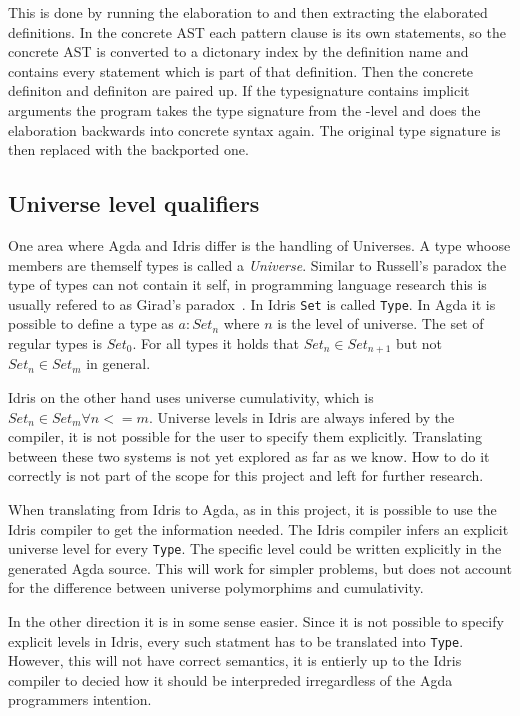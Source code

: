 This is done by running the elaboration to \tti and then extracting the
elaborated definitions. In the concrete AST each pattern clause is its own
statements, so the concrete AST is converted to a dictonary index by the
definition name and contains every statement which is part of that definition.
Then the concrete definiton and \tti definiton are paired up. If the
typesignature contains implicit arguments the program takes the type signature
from the \tti-level and does the elaboration backwards into concrete syntax
again. The original type signature is then replaced with the backported one.

\subsection{Universe level qualifiers}
One area where Agda and Idris differ is the handling of Universes.
A type whoose members are themself types is called a \textit{Universe}. Similar
to Russell's paradox the type of types can not contain it self, in programming
language research this is usually refered to as Girad's
paradox~\cite{coquand1986analysis}.  In Idris \lstinline{Set} is called \lstinline{Type}. In Agda it is possible to define a type as
$a : Set_n$ where $n$ is the level of universe. The set of regular types is
$Set_0$. For all types it holds that $Set_n \in Set_{n+1}$ but not $Set_n \in
Set_m$ in general.

Idris on the other hand uses universe cumulativity, which is $Set_n \in Set_m
\forall n <= m$. Universe levels in Idris are always infered by the compiler,
it is not possible for the user to specify them explicitly. Translating between
these two systems is not yet explored as far as we know. How to do it correctly
is not part of the scope for this project and left for further research.

When translating from Idris to Agda, as in this project, it is possible to use
the Idris compiler to get the information needed. The Idris compiler infers an
explicit universe level for every \lstinline{Type}. The specific level could be
written explicitly in the generated Agda source. This will work for simpler
problems, but does not account for the difference between universe polymorphims
and cumulativity.

In the other direction it is in some sense easier. Since it is not possible to
specify explicit levels in Idris, every such statment has to be translated into
\lstinline{Type}. However, this will not have correct semantics, it is entierly
up to the Idris compiler to decied how it should be interpreded irregardless of
the Agda programmers intention.

